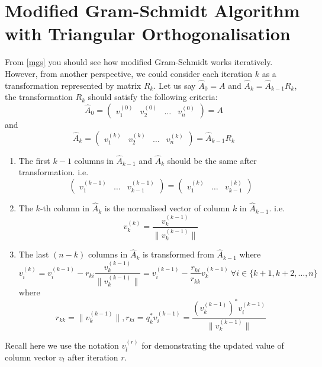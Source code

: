 \section{Modified Gram-Schmidt Algorithm with Triangular Orthogonalisation}
From \autoref{mgs} you should see how modified Gram-Schmidt works iteratively. However, from another perspective, we could consider each iteration \(k\) as a transformation represented by matrix \(R_k\). Let us say $\hat{A}_0 = A$ and $\hat{A}_{k} = \hat{A}_{k - 1}R_k$, the transformation \(R_k\) should satisfy the following criteria:
\[
  \hat{A}_0 = \begin{pmatrix} v_{1}^{(0)} & v_{2}^{(0)} & \ldots & v_{n}^{(0)}\end{pmatrix} = A
\] and 
\[
  \hat{A}_{k} = \begin{pmatrix} v_1^{(k)} & v_2^{(k)} & \ldots & v_{n}^{(k)} \end{pmatrix} = \hat{A}_{k - 1}R_{k}
\] 
\begin{enumerate}
  \item The first $k - 1$ columns in $\hat{A}_{k - 1}$ and $\hat{A}_{k}$ should be the same after transformation. i.e. 
  \[
    \begin{pmatrix} v_1^{(k - 1)} & \ldots & v_{k - 1}^{(k - 1)} \end{pmatrix} = \begin{pmatrix} v_1^{(k)} & \ldots & v_{k - 1}^{(k)} \end{pmatrix} 
  \] 
  \item The $k$-th column in $\hat{A}_{k}$ is the normalised vector of column $k$ in $\hat{A}_{k - 1}$. i.e.
    \[
    v_{k}^{(k)} = \frac{v_{k}^{(k - 1)}}{\|v_{k}^{(k - 1)}\|}
    \] 
  \item The last $(n - k)$ columns in $\hat{A}_{k}$ is transformed from $\hat{A}_{k - 1}$ where
    \[
      v_{i}^{(k)} = v_{i}^{(k - 1)} - r_{ki} \frac{v_k^{(k - 1)}}{\|v_{k}^{(k - 1)}\|} = v_{i}^{(k - 1)} - \frac{r_{ki}}{r_{kk}}v_{k}^{(k - 1)} ~\forall i \in \{k + 1, k + 2, \ldots, n\} 
    \] 
    where
    \[
      r_{kk} = \|v_{k}^{(k - 1)}\|, r_{ki} = q_k^{*}v_{i}^{(k - 1)} = \frac{(v_k^{(k - 1)})^{*}v_{i}^{(k - 1)}}{\|v_{k}^{(k - 1)}\|}
    \]  
\end{enumerate}
Recall here we use the notation \(v_l^{(r)}\) for demonstrating the updated value of column vector \(v_l\) after iteration \(r\).
